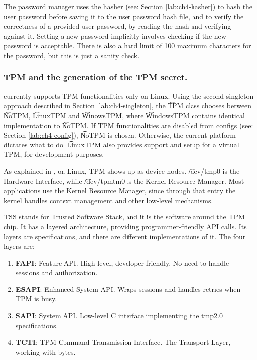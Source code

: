 The password manager uses the hasher (see: Section \ref{lab:ch4-hasher}) to hash the user password before saving it to the user password hash file, and to verify the correctness of a provided user password, by reading the hash and verifying against it.
Setting a new password implicitly involves checking if the new password is acceptable.
There is also a hard limit of 100 maximum characters for the password, but this is just a sanity check.


\subsubsection{TPM and the generation of the TPM secret.} \label{lab:ch4-tpm}

\app{} currently supports TPM functionalities only on Linux.
Using the second singleton approach described in Section \ref{lab:ch4-singleton}, the \t{TPM} class chooses between \t{NoTPM}, \t{LinuxTPM} and \t{WinowsTPM}, where \t{WindowsTPM} contains identical implementation to \t{NoTPM}.
If TPM functionalities are disabled from configs (see: Section \ref{lab:ch4-config}), \t{NoTPM} is chosen.
Otherwise, the current platform dictates what to do.
\t{LinuxTPM} also provides support and setup for a virtual TPM, for development purposes.

As explained in \cite{pi3g_tpm_2025}, on Linux, TPM shows up as device nodes.
\t{/dev/tmp0} is the Hardware Interface, while \t{/dev/tpmtm0} is the Kernel Resource Manager.
Most applications use the Kernel Resource Manager, since through that entry the kernel handles context management and other low-level mechanisms.

TSS stands for Trusted Software Stack, and it is the software around the TPM chip.
It has a layered architecture, providing programmer-friendly API calls.
Its layers are specifications, and there are different implementations of it.
The four layers are:

\begin{enumerate}
    \item \textbf{FAPI}: Feature API. High-level, developer-friendly. No need to handle sessions and authorization.

    \item \textbf{ESAPI}: Enhanced System API. Wraps sessions and handles retries when TPM is busy.

    \item \textbf{SAPI}: System API. Low-level C interface implementing the tmp2.0 specifications.

    \item \textbf{TCTI}: TPM Command Transmission Interface. The Transport Layer, working with bytes.
\end{enumerate}

